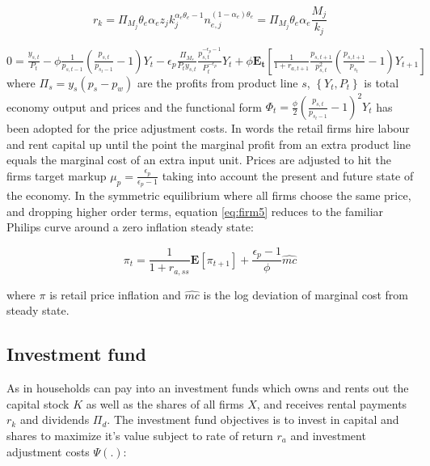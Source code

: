 \documentclass[12pt]{article}
\begin{document}
\begin{equation}
r_{k}=\Pi_{M_{j}}\theta_{e}\alpha_{e} z_{j} k_{j}^{\alpha_{e}\theta_{e}-1} n_{e,j}^{(1-\alpha_{e})\theta_{e}} =     \Pi_{M_{j}}\theta_{e}\alpha_{e}\frac{M_{j}}{k_j}
\label{eq:firm4}
\end{equation}

 $0 = \frac{y_{s,t}}{P_{t}}-\phi\frac{1}{p_{s,t-1}}(\frac{p_{s,t}}{p_{s_t-1}}-1)Y_{t}  -\epsilon_{p} \frac{\Pi_{M_{s}}}{P_{t}y_{s,t}} \frac{p_{s,t}^{-\epsilon_{p}-1}}{P_{t}^{-\epsilon_{p}}}Y_{t} +        \phi\mathbf{E_{t}}\left[\frac{1}{1+r_{a,t+1}} \frac{p_{s,t+1}}{p_{s,t}^2}(\frac{p_{s,t+1}}{p_{s_t}}-1)Y_{t+1}\right]$
 \begin{equation}
 \label{eq:firm5}
\end{equation}
where $\Pi_{s}=y_{s}(p_{s}-p_{w})$ are the profits from product line $s$, $\left\{Y_{t},P_{t}\right\}$ is total economy output and prices and the functional form $\Phi_{t}=\frac{\phi}{2}(\frac{p_{s,t}}{p_{s_t-1}}-1)^2Y_{t} $ has been adopted for the price adjustment costs. 
In words the retail firms hire labour and rent capital up until the point the marginal profit from an extra product line equals the marginal cost of an extra input unit. Prices are adjusted to hit the firms target markup $\mu_{p}=\frac{\epsilon_p}{\epsilon_{p}-1}$ taking into account the present and future state of the economy. In the symmetric equilibrium where all firms choose the same price, and dropping higher order terms, equation \ref{eq:firm5} reduces to the familiar Philips curve around a zero inflation steady state:

\begin{equation}
    \pi_{t}=\frac{1}{1+r_{a,ss}}\mathbf{E}[\pi_{t+1}]+\frac{\epsilon_{p}-1}{\phi}\hat{mc}
    \label{eq:pc}
\end{equation}

where $\pi$ is retail price inflation and $\hat{mc}$ is the log deviation of marginal cost from steady state. 

\subsection{Investment fund}

As in \cite{kaplan2018monetary} households can pay into an investment funds which owns and rents out the capital stock $K$ as well as the shares of all firms $X$, and receives rental payments $r_{k}$ and dividends $\Pi_{d}$. The investment fund objectives is to invest in capital and shares to maximize it's value subject to rate of return $r_a$ and investment adjustment costs $\Psi(.)$:\\
\end{document}
